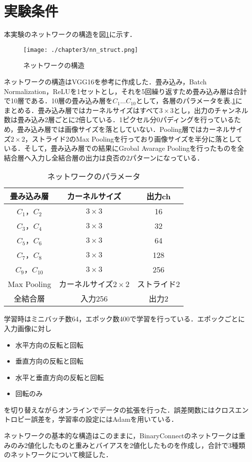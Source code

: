 \section{実験条件}
本実験のネットワークの構造を図\ref{fig_nnst}に示す．
\begin{figure}[]
  \begin{center}
    \texttt{[image: ./chapter3/nn\_struct.png]}
    \caption{ネットワークの構造}
    \label{fig_nnst}
  \end{center}
\end{figure}

ネットワークの構造はVGG16を参考に作成した．畳み込み，Batch Normalization，ReLUを1セットとし，それを5回繰り返すため畳み込み層は合計で10層である．10層の畳み込み層を$C_1 \ldots C_{10}$として，各層のパラメータを表.\ref{table_network_parameter}にまとめる．畳み込み層ではカーネルサイズはすべて$3\times 3$とし，出力のチャンネル数は畳み込み2層ごとに2倍している．1ピクセル分0パディングを行っているため，畳み込み層では画像サイズを落としていない．Pooling層ではカーネルサイズ$2\times 2$，ストライド2のMax Poolingを行っており画像サイズを半分に落としている．そして，畳み込み層での結果にGrobal Avarage Poolingを行ったものを全結合層へ入力し全結合層の出力は良否の2パターンになっている．
\begin{table}
  \caption{ネットワークのパラメータ}
  \label{table_network_parameter}
  \centering
  \begin{tabular}{ccc}
    \hline
    畳み込み層  & カーネルサイズ & 出力ch \\
    \hline \hline
    $C_1$，$C_2$ & $3\times 3$ & 16\\
    $C_3$，$C_4$ & $3\times 3$ & 32\\
    $C_5$，$C_6$ & $3\times 3$ & 64\\
    $C_7$，$C_8$ & $3\times 3$ & 128\\
    $C_9$，$C_{10}$ & $3\times 3$ & 256\\
    \hline
    Max Pooling & カーネルサイズ$2\times 2$ & ストライド2\\
    全結合層 & 入力256 & 出力2\\
    \hline
  \end{tabular}
\end{table}

学習時はミニバッチ数64，エポック数400で学習を行っている．エポックごとに入力画像に対し
\begin{itemize}
  \item 水平方向の反転と回転
  \item 垂直方向の反転と回転
  \item 水平と垂直方向の反転と回転
  \item 回転のみ
\end{itemize}
を切り替えながらオンラインでデータの拡張を行った．誤差関数にはクロスエントロピー誤差を，学習率の設定にはAdamを用いている．

ネットワークの基本的な構造はこのままに，BinaryConnectのネットワークは重みのみ2値化したものと重みとバイアスを2値化したものを作成し，合計で3種類のネットワークについて検証した．